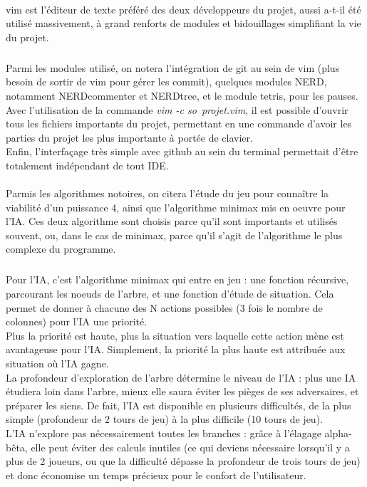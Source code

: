 \documentclass{report}
\begin{document}
    \paragraph*{} %
    vim est l'éditeur de texte préféré des deux développeurs du projet, aussi a-t-il été utilisé massivement, à grand renforts de modules et bidouillages simplifiant la vie du projet.
        \subparagraph*{} %
        Parmi les modules utilisé, on notera l'intégration de git au sein de vim (plus besoin de sortir de vim pour gérer les commit), quelques modules NERD, notamment NERDcommenter et
        NERDtree, et le module tetris, pour les pauses. \\
        Avec l'utilisation de la commande \textit{vim -c so\ projet.vim}, il est possible d'ouvrir tous les fichiers importants du projet, permettant en une commande d'avoir les 
            parties du projet les plus importante à portée de clavier.\\
        Enfin, l'interfaçage très simple avec github au sein du terminal permettait d'être totalement indépendant de tout IDE.
    \paragraph*{} %
    Parmis les algorithmes notoires, on citera l'étude du jeu pour connaître la viabilité d'un puissance 4, ainsi que l'algorithme minimax mis en oeuvre pour l'IA.
    Ces deux algorithme sont choisis parce qu'il sont importants et utilisés souvent, ou, dans le cas de minimax, parce qu'il s'agit de l'algorithme le plus complexe du programme.
        \subparagraph*{} %

        \subparagraph*{} %
        Pour l'IA, c'est l'algorithme minimax qui entre en jeu : une fonction récursive, parcourant les noeuds de l'arbre, et une fonction d'étude de situation. 
        Cela permet de donner à chacune des N actions possibles (3 fois le nombre de colonnes) pour l'IA une priorité. \\
        Plus la priorité est haute, plus la situation vers laquelle cette action mène est avantageuse pour l'IA. Simplement, la priorité la plus haute est attribuée aux situation où 
        l'IA gagne. \\
        La profondeur d'exploration de l'arbre détermine le niveau de l'IA : plus une IA étudiera loin dans l'arbre, mieux elle saura éviter les pièges de ses adversaires, et préparer
        les siens. De fait, l'IA est disponible en plusieurs difficultés, de la plus simple (profondeur de 2 tours de jeu) à la plus difficile (10 tours de jeu). \\
        L'IA n'explore pas nécessairement toutes les branches : grâce à l'élagage alpha-bêta, elle peut éviter des calculs inutiles (ce qui deviens nécessaire lorsqu'il y a plus 
        de 2 joueurs, ou que la difficulté dépasse la profondeur de trois tours de jeu) et donc économise un temps précieux pour le confort de l'utilisateur.
\end{document}
